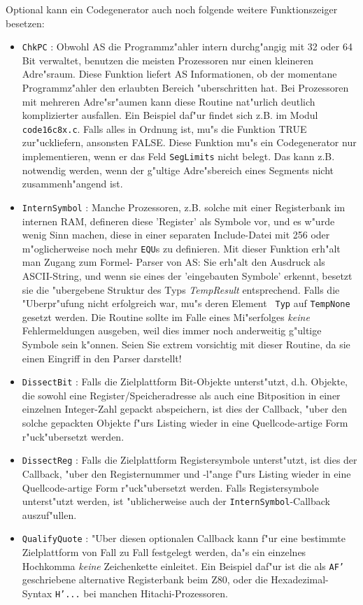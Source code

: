 \documentclass[12pt,a4paper,twoside]{report}
\newcommand{\tty}[1]{{\tt #1}}
\newcommand{\asname}{AS}
\begin{document}
Optional kann ein Codegenerator auch noch folgende weitere Funktionszeiger
besetzen:
\begin{itemize}
\item{\tty{ChkPC} : Obwohl \asname{} die Programmz"ahler intern durchg"angig mit
      32 oder 64 Bit verwaltet, benutzen die meisten Prozessoren nur einen
      kleineren Adre"sraum.  Diese Funktion liefert \asname{} Informationen, ob
      der momentane Programmz"ahler den erlaubten Bereich "uberschritten
      hat.  Bei Prozessoren mit mehreren Adre"sr"aumen kann diese Routine
      nat"urlich deutlich komplizierter ausfallen.  Ein Beispiel daf"ur
      findet sich z.B. im Modul \tty{code16c8x.c}.  Falls alles in Ordnung ist,
      mu"s die Funktion TRUE zur"uckliefern, ansonsten FALSE.
      Diese Funktion mu"s ein Codegenerator nur implementieren, wenn er
      das Feld {\tt SegLimits} nicht belegt.  Das kann z.B. notwendig
      werden, wenn der g"ultige Adre"sbereich eines Segments nicht
      zusammenh"angend ist.}
\item{\tty{InternSymbol} : Manche Prozessoren, z.B. solche mit einer
      Registerbank im internen RAM, defineren diese 'Register' als Symbole
      vor, und es w"urde wenig Sinn machen, diese in einer separaten
      Include-Datei mit 256 oder m"oglicherweise noch mehr {\tt EQU}s
      zu definieren.  Mit dieser Funktion erh"alt man Zugang zum Formel-
      Parser von \asname{}: Sie erh"alt den Ausdruck als ASCII-String, und wenn
      sie eines der 'eingebauten Symbole' erkennt, besetzt sie die
      "ubergebene Struktur des Typs {\em TempResult} entsprechend.  Falls
      die "Uberpr"ufung nicht erfolgreich war, mu"s deren Element {\tt
      Typ} auf {\tt TempNone} gesetzt werden.  Die Routine sollte im
      Falle eines Mi"serfolges {\em keine} Fehlermeldungen ausgeben, weil
      dies immer noch anderweitig g"ultige Symbole sein k"onnen.  Seien
      Sie extrem vorsichtig mit dieser Routine, da sie einen Eingriff in
      den Parser darstellt!}
\item{\tty{DissectBit} : Falls die Zielplattform Bit-Objekte unterst"utzt,
      d.h. Objekte, die sowohl eine Register/Speicheradresse als auch eine
      Bitposition in einer einzelnen Integer-Zahl gepackt abspeichern, ist
      dies der Callback, "uber den solche gepackten Objekte f"urs Listing
      wieder in eine Quellcode-artige Form r"uck"ubersetzt werden.}
\item{\tty{DissectReg} : Falls die Zielplattform Registersymbole unterst"utzt,
      ist dies der Callback, "uber den Registernummer und -l"ange f"urs Listing
      wieder in eine Quellcode-artige Form r"uck"ubersetzt werden.
      Falls Registersymbole unterst"utzt werden, ist "ublicherweise auch
      der \tty{InternSymbol}-Callback auszuf"ullen.}
\item{\tty{QualifyQuote} : "Uber diesen optionalen Callback kann f"ur
      eine bestimmte Zielplattform von Fall zu Fall festgelegt werden, da"s
      ein einzelnes Hochkomma {\em keine} Zeichenkette einleitet.  Ein
      Beispiel daf"ur ist die als \tty{AF'} geschriebene alternative
      Registerbank beim Z80, oder die Hexadezimal-Syntax \tty{H'...} bei
      manchen Hitachi-Prozessoren.}
\end{itemize}
\end{document}
